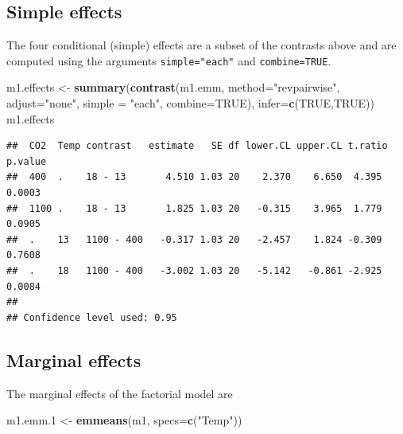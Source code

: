 \documentclass[]{book}
\newenvironment{Shaded}{\begin{snugshade}}{\end{snugshade}}
\newcommand{\KeywordTok}[1]{\textcolor[rgb]{0.13,0.29,0.53}{\textbf{#1}}}
\newcommand{\DataTypeTok}[1]{\textcolor[rgb]{0.13,0.29,0.53}{#1}}
\newcommand{\DecValTok}[1]{\textcolor[rgb]{0.00,0.00,0.81}{#1}}
\newcommand{\StringTok}[1]{\textcolor[rgb]{0.31,0.60,0.02}{#1}}
\newcommand{\OtherTok}[1]{\textcolor[rgb]{0.56,0.35,0.01}{#1}}
\newcommand{\NormalTok}[1]{#1}
\begin{document}
\subsection{Simple effects}\label{simple-effects}

The four conditional (simple) effects are a subset of the contrasts
above and are computed using the arguments \texttt{simple="each"} and
\texttt{combine=TRUE}.

\begin{Shaded}
\begin{Highlighting}[]
\NormalTok{m1.effects <-}\StringTok{ }\KeywordTok{summary}\NormalTok{(}\KeywordTok{contrast}\NormalTok{(m1.emm,}
                 \DataTypeTok{method=}\StringTok{"revpairwise"}\NormalTok{,}
                 \DataTypeTok{adjust=}\StringTok{"none"}\NormalTok{,}
                 \DataTypeTok{simple =} \StringTok{"each"}\NormalTok{,}
                 \DataTypeTok{combine=}\OtherTok{TRUE}\NormalTok{),}
        \DataTypeTok{infer=}\KeywordTok{c}\NormalTok{(}\OtherTok{TRUE}\NormalTok{,}\OtherTok{TRUE}\NormalTok{))}
\NormalTok{m1.effects}
\end{Highlighting}
\end{Shaded}

\begin{verbatim}
##  CO2  Temp contrast   estimate   SE df lower.CL upper.CL t.ratio p.value
##  400  .    18 - 13       4.510 1.03 20    2.370    6.650  4.395  0.0003 
##  1100 .    18 - 13       1.825 1.03 20   -0.315    3.965  1.779  0.0905 
##  .    13   1100 - 400   -0.317 1.03 20   -2.457    1.824 -0.309  0.7608 
##  .    18   1100 - 400   -3.002 1.03 20   -5.142   -0.861 -2.925  0.0084 
## 
## Confidence level used: 0.95
\end{verbatim}

\subsection{Marginal effects}\label{marginal-effects-1}

The marginal effects of the factorial model are

\begin{Shaded}
\begin{Highlighting}[]
\NormalTok{m1.emm.}\DecValTok{1}\NormalTok{ <-}\StringTok{ }\KeywordTok{emmeans}\NormalTok{(m1, }\DataTypeTok{specs=}\KeywordTok{c}\NormalTok{(}\StringTok{"Temp"}\NormalTok{))}
\end{Highlighting}
\end{Shaded}
\end{document}
